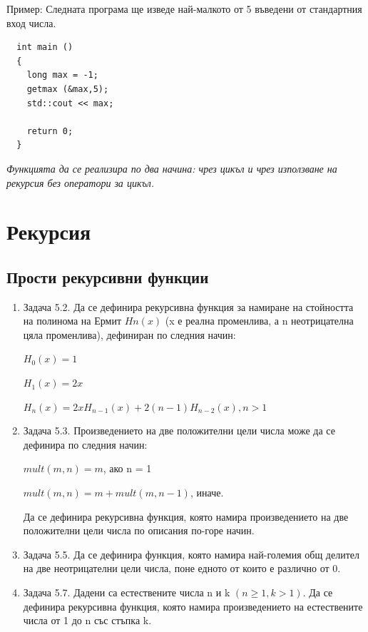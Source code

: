{\begin{enumerate}[resume]
  Пример: Следната програма ще изведе най-малкото от 5 въведени от стандартния вход числа.
  \begin{verbatim}
  int main ()
  {
    long max = -1;
    getmax (&max,5);
    std::cout << max;

    return 0;
  }
  \end{verbatim}
  \emph{Функцията да се реализира по два начина: чрез цикъл и чрез използване на рекурсия без оператори за цикъл.}
\end{enumerate}

\pagebreak

\clearpage\section {Рекурсия}
\subsection {Прости рекурсивни функции}

\begin{enumerate}

	\item Задача 5.2.\cite{sbornik} Да се дефинира рекурсивна функция за намиране на стойността на полинома на Ермит $Hn(x)$ (x е реална променлива, а n неотрицателна цяла променлива), дефиниран по следния начин:

	$H_0(x)=1$

	$H_1(x)=2x$

	$H_n(x)=2xH_{n-1}(x)+2(n-1)H_{n-2}(x), n>1$


	\item Задача 5.3.\cite{sbornik} Произведението на две положителни цели числа може да се дефинира по
следния начин:

	$mult (m,n) = m$, ако n = 1

	$mult (m,n) = m + mult (m,n-1)$, иначе.

	Да се дефинира рекурсивна функция, която намира произведението на две положителни цели числа по описания по-горе начин.

	\item Задача 5.5.\cite{sbornik} Да се дефинира функция, която намира най-големия общ делител на две неотрицателни цели числа, поне едното от които е различно от 0.

	\item Задача 5.7.\cite{sbornik} Дадени са естествените числа n и k $(n \ge 1, k > 1)$. Да се дефинира рекурсивна функция, която намира произведението на естествените числа от 1 до n със стъпка k.


\end{enumerate}}
